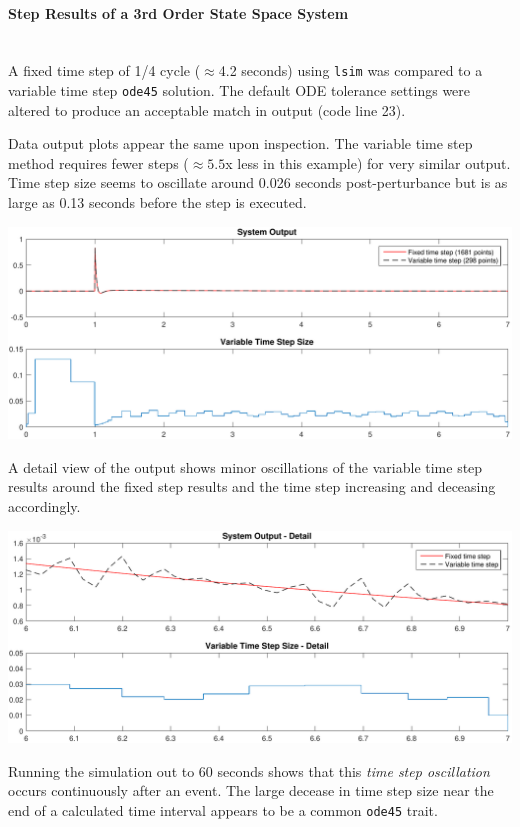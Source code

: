 \documentclass[12pt]{article}
\begin{document}
\onehalfspacing
\paragraph{Step Results of a 3rd Order State Space System} \ \\
A fixed time step of 1/4 cycle ($\approx$4.2 seconds) using \verb|lsim| was compared to a variable time step \verb|ode45| solution.
The default ODE tolerance settings were altered to produce an acceptable match in output (code line 23).

Data output plots appear the same upon inspection.
The variable time step method requires fewer steps ($\approx 5.5$x less in this example) for very similar output.
Time step size seems to oscillate around 0.026 seconds post-perturbance but is as large as 0.13 seconds before the step is executed.

\includegraphics[width=\linewidth]{step}

A detail view of the output shows minor oscillations of the variable time step results around the fixed step results and the time step increasing and deceasing accordingly.

\includegraphics[width=\linewidth]{stepDetail}

\pagebreak
Running the simulation out to 60 seconds shows that this \emph{time step oscillation} occurs continuously after an event.
The large decease in time step size near the end of a calculated time interval appears to be a common \verb|ode45| trait.
\end{document}

